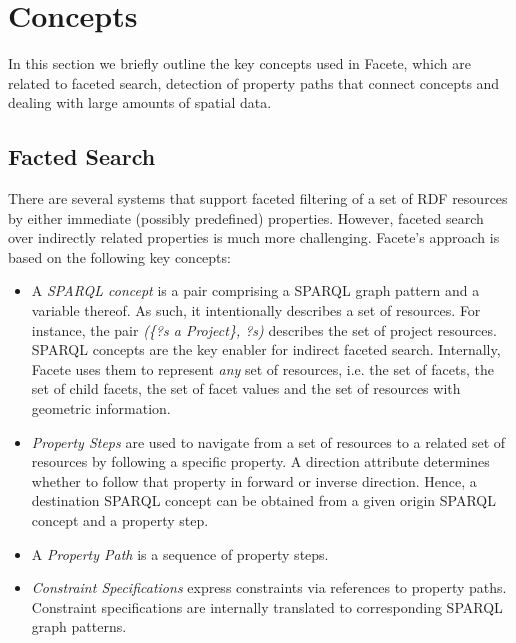 



\section{Concepts}
\label{sec:concepts}

In this section we briefly outline the key concepts used in Facete, which are
related to faceted search, detection of property paths that connect
concepts and dealing with large amounts of spatial data.

\subsection{Facted Search}
There are several systems that support faceted filtering of a set of RDF resources by
either immediate (possibly predefined) properties. However, faceted search over
indirectly related properties is much more challenging. Facete's approach is
based on the following key concepts:
\begin{itemize}
\item A \emph{SPARQL concept} is a pair
comprising a SPARQL graph pattern and a variable thereof.
As such, it intentionally describes a set of resources.
For instance, the pair \emph{(\{?s a Project\}, ?s)} describes the set of
project resources. SPARQL concepts are the key enabler for indirect faceted search.
Internally, Facete uses them to represent \emph{any} set of resources, i.e.
the set of facets, the set of child facets, the set of facet values and the set
of resources with geometric information.
\item \emph{Property Steps} are used to navigate from a set of resources to a
related set of resources by following a specific property.
A direction attribute determines whether to follow that property in forward or
inverse direction.
Hence, a destination SPARQL concept can be obtained from a given origin SPARQL
concept and a property step.
\item A \emph{Property Path} is a sequence of property steps. 
\item \emph{Constraint Specifications} express constraints via references to
property paths. Constraint specifications are internally translated to
corresponding SPARQL graph patterns.
\end{itemize}

